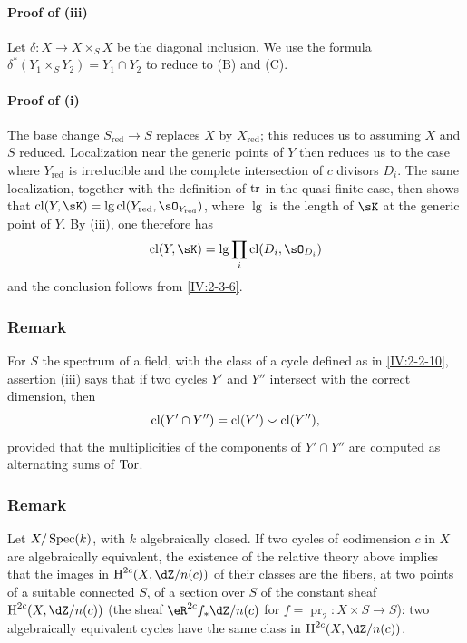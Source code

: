\paragraph{Proof of (iii)}
Let $\delta:X\to X\times_S X$ be the diagonal inclusion. We use the formula
$\delta^\ast(Y_1\times_S Y_2) = Y_1\cap Y_2$ to reduce to (B) and (C).

\paragraph{Proof of (i)}
The base change $S_\text{red}\to S$ replaces $X$ by $X_\text{red}$; this
reduces us to assuming $X$ and $S$ reduced. Localization near the generic
points of $Y$ then reduces us to the case where $Y_\text{red}$ is irreducible
and the complete intersection of $c$ divisors $D_i$. The same localization,
together with the definition of $\operatorname{tr}$ in the quasi-finite case, then shows
that
$\cl(Y,\sK)=\operatorname{lg}\cl(Y_\text{red},\sO_{Y_\text{red}})$, where
$\operatorname{lg}$ is the length of $\sK$ at the generic point of $Y$.
By (iii), one therefore has
\[
  \cl(Y,\sK) = \operatorname{lg} \prod_i \cl(D_i,\sO_{D_i})
\]
and the conclusion follows from \ref{IV:2-3-6}.






\subsubsection{Remark}\label{IV:2-3-9}

For $S$ the spectrum of a field, with the class of a cycle defined as in
\ref{IV:2-2-10}, assertion (iii) says that if two cycles $Y'$ and $Y''$
intersect with the correct dimension, then
\[
  \operatorname{cl}(Y'\cap Y'') = \operatorname{cl}(Y')\smallsmile \operatorname{cl}(Y'')\text{,}
\]
provided that the multiplicities of the components of $Y'\cap Y''$ are
computed as alternating sums of $\operatorname{Tor}$.






\subsubsection{Remark}\label{IV:2-3-10}

Let $X/\operatorname{Spec}(k)$, with $k$ algebraically closed. If two cycles of codimension
$c$ in $X$ are algebraically equivalent, the existence of the relative
theory above implies that the images in $\h^{2 c}(X,\dZ/n(c))$ of their
classes are the fibers, at two points of a suitable connected $S$, of a
section over $S$ of the constant sheaf $\h^{2 c}(X,\dZ/n(c))$ (the sheaf
$\eR^{2 c} f_\ast \dZ/n(c)$ for
$f=\operatorname{pr}_2:X\times S\to S$): two algebraically equivalent cycles
have the same class in $\h^{2 c}(X,\dZ/n(c))$.





















